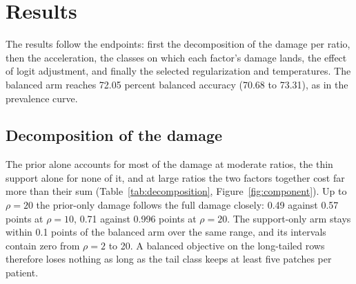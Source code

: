 \section{Results}
\label{sec:results}
The results follow the endpoints: first the decomposition of the damage per ratio, then the acceleration, the classes on which each factor's damage lands, the effect of logit adjustment, and finally the selected regularization and temperatures. The balanced arm reaches 72.05 percent balanced accuracy (70.68 to 73.31), as in the prevalence curve.

\subsection{Decomposition of the damage}
\label{sec:decomposition-results}
The prior alone accounts for most of the damage at moderate ratios, the thin support alone for none of it, and at large ratios the two factors together cost far more than their sum (Table~\ref{tab:decomposition}, Figure~\ref{fig:component}). Up to $\rho=20$ the prior-only damage follows the full damage closely: 0.49 against 0.57 points at $\rho=10$, 0.71 against 0.996 points at $\rho=20$. The support-only arm stays within 0.1 points of the balanced arm over the same range, and its intervals contain zero from $\rho=2$ to 20. A balanced objective on the long-tailed rows therefore loses nothing as long as the tail class keeps at least five patches per patient.

